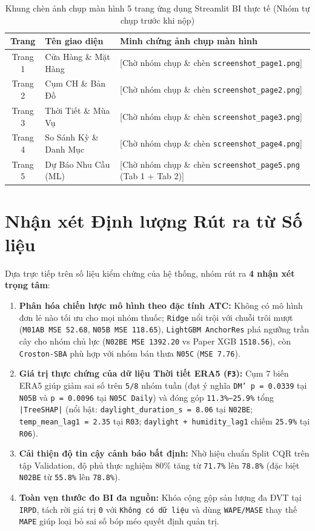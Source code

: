 \begin{table}[H]
\centering
\caption{Khung chèn ảnh chụp màn hình 5 trang ứng dụng Streamlit BI thực tế (Nhóm tự chụp trước khi nộp)}
\label{tab:ui_screenshots}
\renewcommand{\arraystretch}{1.35}
\begin{tabularx}{\textwidth}{|c|p{}|X|}
\hline
\textbf{Trang} & \textbf{Tên giao diện} & \textbf{Minh chứng ảnh chụp màn hình} \\
\hline
Trang 1 & Cửa Hàng \& Mặt Hàng & [Chờ nhóm chụp \& chèn \texttt{screenshot\_page1.png}] \\
\hline
Trang 2 & Cụm CH \& Bản Đồ & [Chờ nhóm chụp \& chèn \texttt{screenshot\_page2.png}] \\
\hline
Trang 3 & Thời Tiết \& Mùa Vụ & [Chờ nhóm chụp \& chèn \texttt{screenshot\_page3.png}] \\
\hline
Trang 4 & So Sánh Kỳ \& Danh Mục & [Chờ nhóm chụp \& chèn \texttt{screenshot\_page4.png}] \\
\hline
Trang 5 & Dự Báo Nhu Cầu (ML) & [Chờ nhóm chụp \& chèn \texttt{screenshot\_page5.png} (Tab 1 + Tab 2)] \\
\hline
\end{tabularx}
\end{table}

\section{Nhận xét Định lượng Rút ra từ Số liệu}
Dựa trực tiếp trên số liệu kiểm chứng của hệ thống, nhóm rút ra \textbf{4 nhận xét trọng tâm}:
\begin{enumerate}[leftmargin=1.5em]
  \item \textbf{Phân hóa chiến lược mô hình theo đặc tính ATC:} Không có mô hình đơn lẻ nào tối ưu cho mọi nhóm thuốc; \texttt{Ridge} nổi trội với chuỗi trôi mượt (\texttt{M01AB MSE 52.68}, \texttt{N05B MSE 118.65}), \texttt{LightGBM AnchorRes} phá ngưỡng trần cây cho nhóm chủ lực (\texttt{N02BE MSE 1392.20} vs Paper XGB \texttt{1518.56}), còn \texttt{Croston-SBA} phù hợp với nhóm bán thưa \texttt{N05C} (\texttt{MSE 7.76}).
  \item \textbf{Giá trị thực chứng của dữ liệu Thời tiết ERA5 (\texttt{F3}):} Cụm 7 biến ERA5 giúp giảm sai số trên \texttt{5/8} nhóm tuần (đạt ý nghĩa \texttt{DM' p = 0.0339} tại \texttt{N05B} và \texttt{p = 0.0096} tại \texttt{N05C Daily}) và đóng góp \texttt{11.3\%--25.9\%} tổng \texttt{|TreeSHAP|} (nổi bật: \texttt{daylight\_duration\_s = 8.06} tại \texttt{N02BE}; \texttt{temp\_mean\_lag1 = 2.35} tại \texttt{R03}; \texttt{daylight + humidity\_lag1} chiếm \texttt{25.9\%} tại \texttt{R06}).
  \item \textbf{Cải thiện độ tin cậy cảnh báo bất định:} Nhờ hiệu chuẩn Split CQR trên tập Validation, độ phủ thực nghiệm 80\% tăng từ \texttt{71.7\%} lên \texttt{78.8\%} (đặc biệt \texttt{N02BE} từ \texttt{55.8\%} lên \texttt{78.8\%}).
  \item \textbf{Toàn vẹn thước đo BI đa nguồn:} Khóa cộng gộp sản lượng đa ĐVT tại \texttt{IRPD}, tách rời giá trị \texttt{0} với \texttt{Không có dữ liệu} và dùng \texttt{WAPE/MASE} thay thế \texttt{MAPE} giúp loại bỏ sai số bóp méo quyết định quản trị.
\end{enumerate}

